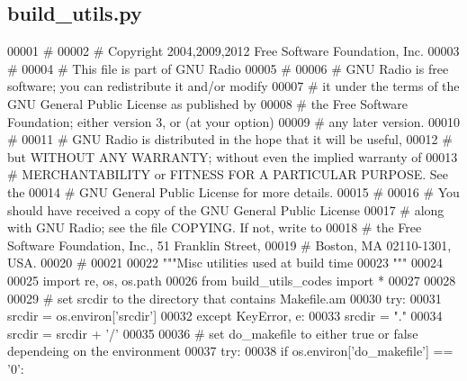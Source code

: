 \subsection{build\+\_\+utils.\+py}
\label{build__utils_8py_source}

\begin{DoxyCode}
00001 \textcolor{comment}{#}
00002 \textcolor{comment}{# Copyright 2004,2009,2012 Free Software Foundation, Inc.}
00003 \textcolor{comment}{#}
00004 \textcolor{comment}{# This file is part of GNU Radio}
00005 \textcolor{comment}{#}
00006 \textcolor{comment}{# GNU Radio is free software; you can redistribute it and/or modify}
00007 \textcolor{comment}{# it under the terms of the GNU General Public License as published by}
00008 \textcolor{comment}{# the Free Software Foundation; either version 3, or (at your option)}
00009 \textcolor{comment}{# any later version.}
00010 \textcolor{comment}{#}
00011 \textcolor{comment}{# GNU Radio is distributed in the hope that it will be useful,}
00012 \textcolor{comment}{# but WITHOUT ANY WARRANTY; without even the implied warranty of}
00013 \textcolor{comment}{# MERCHANTABILITY or FITNESS FOR A PARTICULAR PURPOSE.  See the}
00014 \textcolor{comment}{# GNU General Public License for more details.}
00015 \textcolor{comment}{#}
00016 \textcolor{comment}{# You should have received a copy of the GNU General Public License}
00017 \textcolor{comment}{# along with GNU Radio; see the file COPYING.  If not, write to}
00018 \textcolor{comment}{# the Free Software Foundation, Inc., 51 Franklin Street,}
00019 \textcolor{comment}{# Boston, MA 02110-1301, USA.}
00020 \textcolor{comment}{#}
00021 
00022 \textcolor{stringliteral}{"""Misc utilities used at build time}
00023 \textcolor{stringliteral}{"""}
00024 
00025 \textcolor{keyword}{import} re, os, os.path
00026 \textcolor{keyword}{from} build\_utils\_codes \textcolor{keyword}{import} *
00027 
00028 
00029 \textcolor{comment}{# set srcdir to the directory that contains Makefile.am}
00030 \textcolor{keywordflow}{try}:
00031     srcdir = os.environ[\textcolor{stringliteral}{'srcdir'}]
00032 \textcolor{keywordflow}{except} KeyError, e:
00033     srcdir = \textcolor{stringliteral}{"."}
00034 srcdir = srcdir + \textcolor{stringliteral}{'/'}
00035 
00036 \textcolor{comment}{# set do\_makefile to either true or false dependeing on the environment}
00037 \textcolor{keywordflow}{try}:
00038     \textcolor{keywordflow}{if} os.environ[\textcolor{stringliteral}{'do\_makefile'}] == \textcolor{stringliteral}{'0'}:

\end{DoxyCode}
